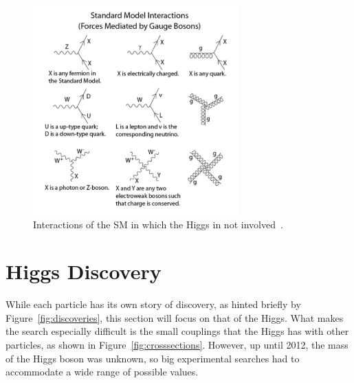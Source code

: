 \begin{figure}[ht]
 \begin{center}
    \includegraphics[width=0.70\textwidth]{figures/intro/Standard_Model_Feynman_Diagram_Vertices.pdf}
      \end{center}
\caption{Interactions of the SM in which the Higgs in not involved~\cite{SMinteractions_nonhiggs}.}
\label{fig:nonhiggsint}
\end{figure}

\section{Higgs Discovery\label{sec:discovery}}

While each particle has its own story of discovery, as hinted briefly by Figure~\ref{fig:discoveries},
this section will focus on that of the Higgs. What makes the search especially difficult is the
small couplings that the Higgs has with other particles, as shown in Figure~\ref{fig:crosssections}.
However, up until 2012, the mass of the Higgs boson was unknown, so big experimental searches
had to accommodate a wide range of possible values.

